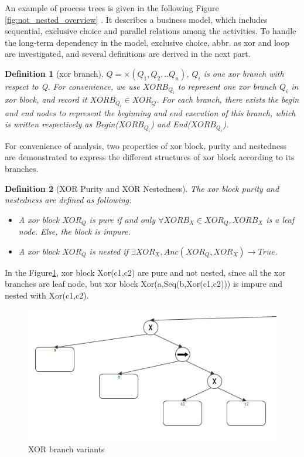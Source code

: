 \documentclass[]{article}
\newtheorem{mydef}{Definition}[section]
\begin{document}
An example of process trees is given in the following Figure \ref{fig:not_nested_overview} . It describes a business model, which includes sequential, exclusive choice and parallel relations among the activities. To handle the long-term dependency in the model, exclusive choice, abbr. as xor  and loop are investigated, and several definitions are derived in the next part.
\begin{mydef}[xor branch]
   $Q= \times(Q_1 , Q_2 ,.. Q_n)$, $Q_i$ is one xor branch with respect to Q. For convenience, we use $XORB_{Q_i}$ to represent one xor branch $Q_i$ in xor block, and record it $XORB_{Q_i} \in XOR_{Q}$. For each branch, there exists the begin and end nodes to represent the beginning and end execution of this branch, which is written respectively as Begin($XORB_{Q_i}$) and End($XORB_{Q_i}$).
\end{mydef}
For convenience of analysis, two properties of xor block, purity and nestedness are demonstrated to express the different structures of xor block according to its branches.
\begin{mydef}[XOR Purity and XOR Nestedness] The xor block purity and nestedness are defined as following: \\
	\begin{itemize}
		\item A xor block $XOR_Q$ is pure if and only $\forall XORB_X \in XOR_Q, XORB_X $ is a leaf node. Else, the block is impure.
		\item A xor block $XOR_Q$ is nested if $ \exists XOR_X, Anc(XOR_Q, XOR_X) \rightarrow True  $.
	\end{itemize}
\end{mydef}
In the Figure\ref {fig:xor_nested_branch_variants}, xor block Xor(c1,c2) are pure and not nested, since all the xor branches are leaf node, but xor block Xor(a,Seq(b,Xor(c1,c2))) is impure and nested with Xor(c1,c2). 
\begin{figure}[h!]
	\includegraphics[width=\textwidth]{PT02_xor_nested_and_pure.png}
	\caption{XOR branch variants}
	\label{fig:xor_nested_branch_variants}
\end{figure}
\end{document}
